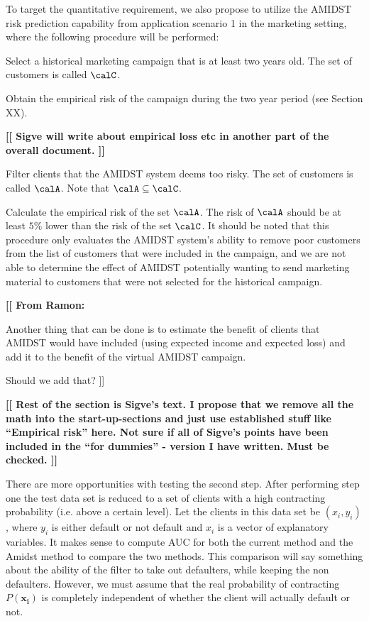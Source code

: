\documentclass{article}
\theoremstyle{theorem}
\theoremstyle{definition}
\newcommand{\bv}[1]{\bm{#1}}
\newcommand{\comment}[1]{ \begin{center}{\bf [[ #1 ]]}\end{center}}
\begin{document}
To target the quantitative requirement, we also propose to utilize the AMIDST risk prediction capability from application scenario 1 in the marketing setting, where the following procedure will be performed:
\bit
\item Select a historical marketing campaign that is at least two years old. The set of customers is called $\calC$.
\item Obtain the empirical risk of the campaign during the two year period (see Section XX). \comment{Sigve will write about empirical loss etc in another part of the overall document.} 
\item  Filter clients that the AMIDST system deems too risky. The set of customers is called $\calA$. Note that $\calA\subseteq\calC$.
\item Calculate the empirical risk of the set $\calA$. The risk of $\calA$ should be at least $5\%$ lower than the risk of the set $\calC$.
\eit
It should be noted that this procedure only evaluates the AMIDST system's ability to remove poor customers from the list of customers that were included in the campaign, and we are not able to determine the effect of AMIDST potentially wanting to send marketing material to customers that were not selected for the historical campaign. 


\comment{From Ramon:

\bit
\item Another thing that can be done is to estimate the benefit of clients that AMIDST would have included (using expected income and expected loss) and add it to the benefit of the virtual AMIDST campaign.
\eit

Should we add that?}




\comment{Rest of the section is Sigve's text. I propose that we remove all the math into the start-up-sections and just use established stuff like ``Empirical risk'' here. Not sure if all of Sigve's points have been included in the ``for dummies'' - version I have written. Must be checked.}



There are more opportunities with testing the second step.  After performing step one the test data set is reduced to a set of clients with a high contracting probability (i.e. above a certain level).  Let the clients in this data set be $(x_i, y_i)$, where $y_i$ is either default or not default and $x_i$ is a vector of explanatory variables.  It makes sense to compute AUC for both the current method and the Amidst method to compare the two methods.  This comparison will say something about the ability of the filter to take out defaulters, while keeping the non defaulters.  However, we must assume that the real probability of contracting $P(\bv{x_i})$ is completely independent of whether the client will actually default or not.
\end{document}
